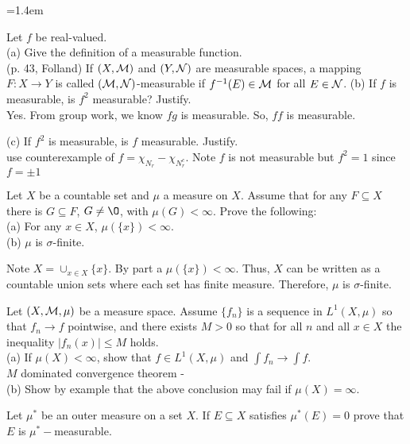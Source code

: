 \begin{list}
{}
{\leftmargin=1.4em}
\item Let $f$ be real-valued.\\
(a) Give the definition of a measurable function.\\
(p. 43, Folland) If $(X, {\mathcal M})$ and $(Y, {\mathcal N})$ are measurable spaces, a mapping $F: X \rightarrow Y$ is called $({\mathcal M}, {\mathcal N})$-measurable if $f^{-1}(E) \in {\mathcal M}$ for all $E \in {\mathcal N}$.
(b) If $f$ is measurable, is $f^2$ measurable? Justify.\\
Yes. From group work, we know $fg$ is measurable. So, $ff$ is measurable. 

(c) If $f^2$ is measurable, is $f$ measurable. Justify.\\
use counterexample of $f=\chi_{N_r}-\chi_{N_r^c}$. Note $f$ is not measurable but $f^2 = 1$ since $f=\pm 1$

\item Let $X$ be a countable set and $\mu$ a measure on $X$. Assume that for any $F \subseteq X$ there is $G \subseteq F$, $G \neq \O$, with $\mu(G)< \infty$. Prove the following:\\
 (a) For any $x \in X$, $\mu(\{x \})< \infty$.\\
 (b) $\mu$ is $\sigma$-finite.\\
 \begin{pf}
 Note $X = \cup_{x \in X}\{x\}$. By part a $\mu(\{x\})< \infty$. Thus, $X$ can be written as a countable union sets where each set has finite measure. Therefore, $\mu$ is $\sigma$-finite.
 \end{pf}
 \item Let $(X, {\mathcal M}, \mu)$ be a measure space. Assume $\{f_n\}$ is a sequence in $L^1(X, \mu)$ so that $f_n \rightarrow f$ pointwise, and there exists $M>0$ so that for all $n$ and all $x \in X$ the inequality $|f_n(x)|\leq M$ holds.\\
 (a) If $\mu(X)< \infty$, show that $f \in L^1(X, \mu)$ and $\int f_n \rightarrow \int f$.\\ 
 $M$ dominated convergence theorem - \\
 (b) Show by example that the above conclusion may fail if $\mu(X)=\infty$.
 \item Let $\mu^*$ be an outer measure on a set $X$. If $E \subseteq X$ satisfies $\mu^*(E)=0$ prove that $E$ is $\mu^*-$measurable. 
\begin{pf}
	

\end{pf}
\end{list}
